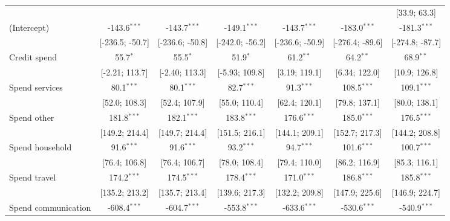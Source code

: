 \begin{table}[htbp]
\begin{threeparttable}[b]
\begin{tabular}{lcccccc}
                                   &                  &                  &                  &                  &                  & [33.9; 63.3]\\   
         (Intercept)               & -143.6$^{***}$   & -143.7$^{***}$   & -149.1$^{***}$   & -143.7$^{***}$   & -183.0$^{***}$   & -181.3$^{***}$\\   
                                   & [-236.5; -50.7]  & [-236.6; -50.8]  & [-242.0; -56.2]  & [-236.6; -50.9]  & [-276.4; -89.6]  & [-274.8; -87.7]\\   
         Credit spend              & 55.7$^{*}$       & 55.5$^{*}$       & 51.9$^{*}$       & 61.2$^{**}$      & 64.2$^{**}$      & 68.9$^{**}$\\   
                                   & [-2.21; 113.7]   & [-2.40; 113.3]   & [-5.93; 109.8]   & [3.19; 119.1]    & [6.34; 122.0]    & [10.9; 126.8]\\   
         Spend services            & 80.1$^{***}$     & 80.1$^{***}$     & 82.7$^{***}$     & 91.3$^{***}$     & 108.5$^{***}$    & 109.1$^{***}$\\   
                                   & [52.0; 108.3]    & [52.4; 107.9]    & [55.0; 110.4]    & [62.4; 120.1]    & [79.8; 137.1]    & [80.0; 138.1]\\   
         Spend other               & 181.8$^{***}$    & 182.1$^{***}$    & 183.8$^{***}$    & 176.6$^{***}$    & 185.0$^{***}$    & 176.5$^{***}$\\   
                                   & [149.2; 214.4]   & [149.7; 214.4]   & [151.5; 216.1]   & [144.1; 209.1]   & [152.7; 217.3]   & [144.2; 208.8]\\   
         Spend household           & 91.6$^{***}$     & 91.6$^{***}$     & 93.2$^{***}$     & 94.7$^{***}$     & 101.6$^{***}$    & 100.7$^{***}$\\   
                                   & [76.4; 106.8]    & [76.4; 106.7]    & [78.0; 108.4]    & [79.4; 110.0]    & [86.2; 116.9]    & [85.3; 116.1]\\   
         Spend travel              & 174.2$^{***}$    & 174.5$^{***}$    & 178.4$^{***}$    & 171.0$^{***}$    & 186.8$^{***}$    & 185.8$^{***}$\\   
                                   & [135.2; 213.2]   & [135.7; 213.4]   & [139.6; 217.3]   & [132.2; 209.8]   & [147.9; 225.6]   & [146.9; 224.7]\\   
         Spend communication       & -608.4$^{***}$   & -604.7$^{***}$   & -553.8$^{***}$   & -633.6$^{***}$   & -530.6$^{***}$   & -540.9$^{***}$\\   

\end{tabular}
\end{threeparttable}
\end{table}
